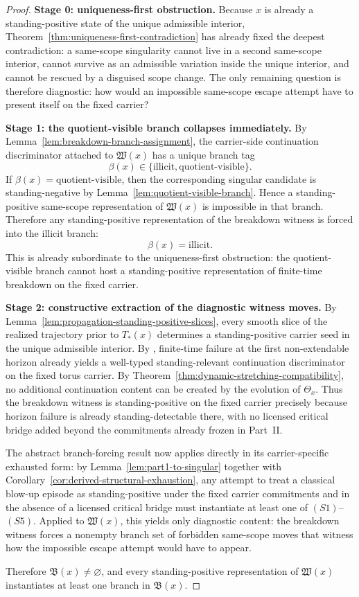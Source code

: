 \begin{proof}
\textbf{Stage 0: uniqueness-first obstruction.}
Because $x$ is already a standing-positive state of the unique admissible interior, Theorem~\ref{thm:uniqueness-first-contradiction} has already fixed the deepest contradiction: a same-scope singularity cannot live in a second same-scope interior, cannot survive as an admissible variation inside the unique interior, and cannot be rescued by a disguised scope change. The only remaining question is therefore diagnostic: how would an impossible same-scope escape attempt have to present itself on the fixed carrier?

\textbf{Stage 1: the quotient-visible branch collapses immediately.}
By Lemma~\ref{lem:breakdown-branch-assignment}, the carrier-side continuation discriminator attached to
$\mathfrak W(x)$ has a unique branch tag
\[
\beta(x)\in\{\mathrm{illicit},\mathrm{quotient\mbox{-}visible}\}.
\]
If $\beta(x)=\mathrm{quotient\mbox{-}visible}$, then the corresponding singular candidate is standing-negative by
Lemma~\ref{lem:quotient-visible-branch}. Hence a standing-positive same-scope representation of
$\mathfrak W(x)$ is impossible in that branch. Therefore any standing-positive representation of the
breakdown witness is forced into the illicit branch:
\[
\beta(x)=\mathrm{illicit}.
\]
This is already subordinate to the uniqueness-first obstruction: the quotient-visible branch cannot host a standing-positive representation of finite-time breakdown on the fixed carrier.

\textbf{Stage 2: constructive extraction of the diagnostic witness moves.}
By Lemma~\ref{lem:propagation-standing-positive-slices}, every smooth slice of the realized trajectory
prior to $T_*(x)$ determines a standing-positive carrier seed in the unique admissible interior. By
\HorizonDetectabilityRef{}, finite-time failure at the first non-extendable horizon already yields a
well-typed standing-relevant continuation discriminator on the fixed torus carrier. By
Theorem~\ref{thm:dynamic-stretching-compatibility}, no additional continuation content can be created
by the evolution of $\Theta_x$. Thus the breakdown witness is standing-positive on the fixed carrier
precisely because horizon failure is already standing-detectable there, with no licensed critical
bridge added beyond the commitments already frozen in Part~II.

The abstract branch-forcing result now applies directly in its carrier-specific exhausted form: by
Lemma~\ref{lem:part1-to-singular} together with Corollary~\ref{cor:derived-structural-exhaustion}, any
attempt to treat a classical blow-up episode as standing-positive under the fixed carrier commitments
and in the absence of a licensed critical bridge must instantiate at least one of $(S1)$--$(S5)$. Applied
to $\mathfrak W(x)$, this yields only diagnostic content: the breakdown witness forces a nonempty branch set of forbidden same-scope moves that witness how the impossible escape attempt would have to appear.

Therefore $\mathfrak B(x)\neq\varnothing$, and every standing-positive representation of
$\mathfrak W(x)$ instantiates at least one branch in $\mathfrak B(x)$.
\end{proof}

